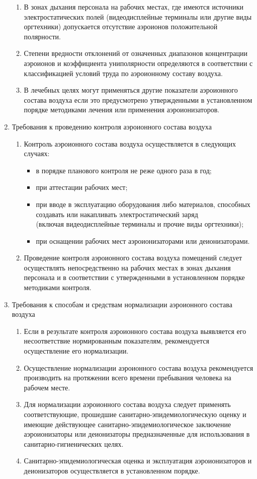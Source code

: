 \begin{enumerate}
\begin{enumerate}
		\item В зонах дыхания персонала на рабочих местах, где имеются источники электростатических полей (видеодисплейные терминалы или другие виды оргтехники) допускается отсутствие аэроионов положительной полярности.
		\item Степени вредности отклонений от означенных диапазонов концентрации аэроионов и коэффициента униполярности определяются в соответствии с классификацией условий труда по аэроионному составу воздуха.
		\item В лечебных целях могут применяться другие показатели аэроионного состава воздуха если это предусмотрено утвержденными в установленном порядке методиками лечения или применения аэроионизаторов.
	\end{enumerate}
\item Требования к проведению контроля аэроионного состава воздуха
	\begin{enumerate}
	\item Контроль аэроионного состава воздуха осуществляется в следующих случаях: 
		\begin{itemize}
		\item в порядке планового контроля не реже одного раза в год;
		\item при аттестации рабочих мест;
		\item при вводе в эксплуатацию оборудования либо материалов, способных создавать или накапливать электростатический заряд \\(включая видеодисплейные терминалы и прочие виды оргтехники);
		\item при оснащении рабочих мест аэроионизаторами или деионизаторами.
		\end{itemize}
	\item Проведение контроля аэроионного состава воздуха помещений следует осуществлять непосредственно на рабочих местах в зонах дыхания персонала и в соответствии с утвержденными в установленном порядке методиками контроля.
	\end{enumerate}
\item Требования к способам и средствам нормализации аэроионного состава воздуха
	\begin{enumerate}
	\item Если в результате контроля аэроионного состава воздуха выявляется его несоответствие нормированным показателям, рекомендуется осуществление его нормализации.
	\item Осуществление нормализации аэроионного состава воздуха рекомендуется производить на протяжении всего времени пребывания человека на рабочем месте.
	\item Для нормализации аэроионного состава воздуха следует применять соответствующие, прошедшие санитарно-эпидемиологическую оценку и имеющие действующее санитарно-эпидемиологическое заключение аэроионизаторы или деионизаторы предназначенные для использования в санитарно-гигиенических целях.
	\item Санитарно-эпидемиологическая оценка и эксплуатация аэроионизаторов и деионизаторов осуществляется в установленном порядке.

	\end{enumerate}
\end{enumerate}

